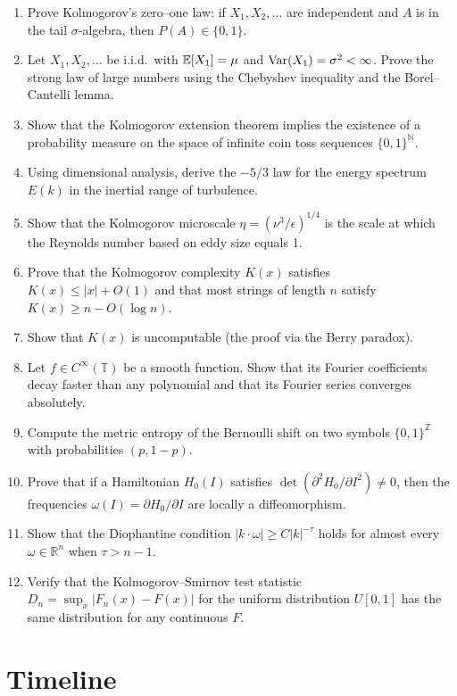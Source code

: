 \begin{enumerate}
    \item [I] Prove Kolmogorov's zero--one law: if $X_1, X_2, \dots$ are independent and $A$ is in the tail $\sigma$-algebra, then $P(A) \in \{0,1\}$.
    \item [I] Let $X_1, X_2, \dots$ be i.i.d.\ with $\operatorname{\mathbb{E}}[X_1] = \mu$ and $\operatorname{Var}(X_1) = \sigma^2 < \infty$. Prove the strong law of large numbers using the Chebyshev inequality and the Borel--Cantelli lemma.
    \item [B] Show that the Kolmogorov extension theorem implies the existence of a probability measure on the space of infinite coin toss sequences $\{0,1\}^\mathbb{N}$.
    \item [I] Using dimensional analysis, derive the $-5/3$ law for the energy spectrum $E(k)$ in the inertial range of turbulence.
    \item [B] Show that the Kolmogorov microscale $\eta = (\nu^3/\epsilon)^{1/4}$ is the scale at which the Reynolds number based on eddy size equals 1.
    \item [I] Prove that the Kolmogorov complexity $K(x)$ satisfies $K(x) \leq |x| + O(1)$ and that most strings of length $n$ satisfy $K(x) \geq n - O(\log n)$.
    \item [I] Show that $K(x)$ is uncomputable (the proof via the Berry paradox).
    \item [B] Let $f \in C^\infty(\mathbb{T})$ be a smooth function. Show that its Fourier coefficients decay faster than any polynomial and that its Fourier series converges absolutely.
    \item [I] Compute the metric entropy of the Bernoulli shift on two symbols $\{0,1\}^\mathbb{Z}$ with probabilities $(p, 1-p)$.
    \item [I] Prove that if a Hamiltonian $H_0(I)$ satisfies $\det(\partial^2 H_0/\partial I^2) \neq 0$, then the frequencies $\omega(I) = \partial H_0/\partial I$ are locally a diffeomorphism.
    \item [I] Show that the Diophantine condition $|k \cdot \omega| \geq C|k|^{-\tau}$ holds for almost every $\omega \in \mathbb{R}^n$ when $\tau > n-1$.
    \item [B] Verify that the Kolmogorov--Smirnov test statistic $D_n = \sup_x |F_n(x) - F(x)|$ for the uniform distribution $U[0,1]$ has the same distribution for any continuous $F$.
\end{enumerate}

\section*{Timeline}

